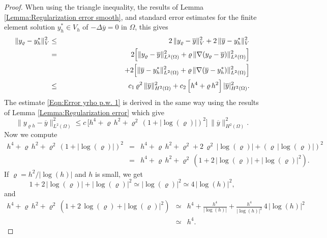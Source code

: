 \documentclass{article}
\numberwithin{equation}{section}
\begin{document}
\begin{proof}
  When using the triangle inequality, the results of
  Lemma \ref{Lemma:Regularization error smooth}, and standard error estimates
  for the finite element solution $y_h^* \in V_h$ of
  $- \Delta \overline{y}=0$ in $\Omega$, this gives
  \begin{eqnarray*}
    \| y_\varrho - y_h^* \|_V^2
    & \leq & 2 \, \| y_\varrho - \overline{y} \|_V^2 +
             2 \, \| \overline{y} - y_h^* \|_V^2 \\
    & = & 2 \Big[ \| y_\varrho - \overline{y} \|_{L^2(\Omega)}^2 +
          \varrho \, \| \nabla (y_\varrho - \overline{y}) \|^2_{L^2(\Omega)}
          \Big] \\
    && \hspace*{3cm} +
          2 \Big[ \| \overline{y} - y_h^* \|_{L^2(\Omega)}^2 +
          \varrho \, \| \nabla (\overline{y}-y_h^*) \|^2_{L^2(\Omega)}
       \Big] \\
    & \leq & c_1 \, \varrho^2 \, \| \overline{y} \|_{H^2(\Omega)}^2
             + c_2 \,
             \Big[ h^4 + \varrho \, h^2 \Big] \, |\overline{y}|_{H^2(\Omega)}^2 .
  \end{eqnarray*}
  The estimate \eqref{Eqn:Error yrho p.w. 1} is derived in the same way
  using the results of Lemma \ref{Lemma:Regularization error} which give
  \begin{equation*}
    \| y_{\varrho h}-\overline{y} \|_{L^2(\Omega)}^2 \leq
    c \, \Big[ h^4 + \varrho \, h^2 + \varrho^2 \, (1+|\log(\varrho)|)^2
    \Big] \, \| \overline{y} \|_{H^2(\Omega)}^2. 
  \end{equation*}
  Now we compute 
  \begin{eqnarray*}
    h^4 + \varrho \, h^2 + \varrho^2 \, (1+|\log(\varrho)|)^2
    & = & h^4 + \varrho \, h^2 + \varrho^2 + 2 \, \varrho^2 \,
          |\log(\varrho)| + (\varrho \, |\log(\varrho)|)^2 \\
    & = & h^4 + \varrho \, h^2 + \varrho^2 \, (1+ 2 \, |\log(\varrho)| +
          |\log(\varrho)|^2) .
  \end{eqnarray*}
  If $\varrho = h^2/|\log(h)|$  and $h$ is small, we get
  \[
    1 + 2\, |\log(\varrho)| + |\log(\varrho)|^2 \simeq
    |\log(\varrho)|^2 \simeq 4 \, |\log(h)|^2,
  \]
  and  
  \begin{eqnarray*}
    h^4 + \varrho \, h^2 + \varrho^2 \,
    (1+ 2 \, \log(\varrho) + |\log(\varrho)|^2)
    & \simeq & h^4 + \frac{h^4}{|\log(h)|} +
               \frac{h^4}{|\log(h)|^2} \, 4 \, |\log(h)|^2 \\
    & \simeq & h^4.
  \end{eqnarray*}
\end{proof}
\end{document}
